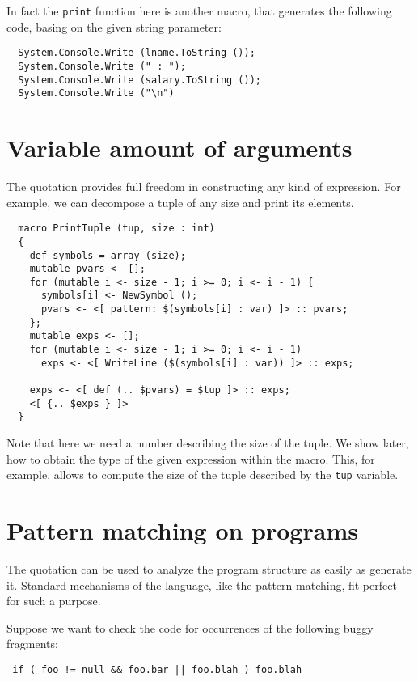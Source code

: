 \documentclass{llncs}
\begin{document}
In fact the \verb,print, function here is another macro, that generates 
the following code, basing on the given string parameter:

\begin{verbatim}
  System.Console.Write (lname.ToString ());
  System.Console.Write (" : ");
  System.Console.Write (salary.ToString ());
  System.Console.Write ("\n")
\end{verbatim}

\section{Variable amount of arguments}
The quotation provides full freedom in constructing any kind of expression.
For example, we can decompose a tuple of any size and print its elements.

\begin{verbatim}
  macro PrintTuple (tup, size : int)
  {
    def symbols = array (size);
    mutable pvars <- [];
    for (mutable i <- size - 1; i >= 0; i <- i - 1) {
      symbols[i] <- NewSymbol ();
      pvars <- <[ pattern: $(symbols[i] : var) ]> :: pvars;
    };
    mutable exps <- [];
    for (mutable i <- size - 1; i >= 0; i <- i - 1)
      exps <- <[ WriteLine ($(symbols[i] : var)) ]> :: exps;

    exps <- <[ def (.. $pvars) = $tup ]> :: exps;
    <[ {.. $exps } ]>
  }
\end{verbatim} %

Note that here we need a number describing the size of the tuple. We show later, 
how to obtain the type of the given expression within the macro. This, for 
example, allows to compute the size of the tuple described by the \verb,tup, variable.

\section{Pattern matching on programs}
The quotation can be used to analyze the program structure as easily as generate
it. Standard mechanisms of the language, like the pattern matching, fit perfect
for such a purpose. 

Suppose we want to check the code for occurrences of the following buggy
fragments:
\begin{verbatim}
 if ( foo != null && foo.bar || foo.blah ) foo.blah
\end{verbatim}
\end{document}
